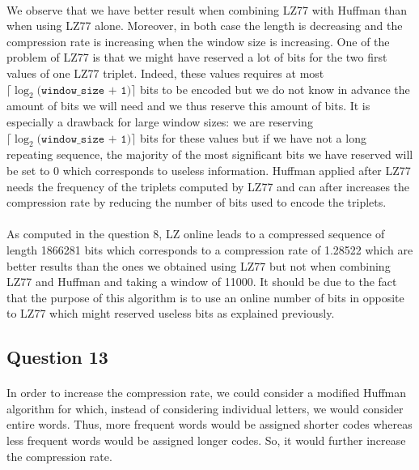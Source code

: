 \documentclass[a4paper, 11pt, oneside]{article}
\begin{document}
\paragraph{}We observe that we have better result when combining LZ77 with Huffman than when using LZ77 alone. Moreover, in both case the length is decreasing and the compression rate is increasing when the window size is increasing.
One of the problem of LZ77 is that we might have reserved a lot of bits for the two first values of one LZ77 triplet. Indeed, these values requires at most $\lceil\log_2({\texttt{window\_size + 1})}\rceil$ bits to be encoded but we do not know in advance the amount of bits we will need and we thus reserve this amount of bits. It is especially a drawback for large window sizes: we are reserving $\lceil\log_2({\texttt{window\_size + 1})}\rceil$  bits for these values but
if we have not a long repeating sequence, the majority of the most significant bits we have reserved will be set to 0 which corresponds to useless information. Huffman applied after LZ77 needs the frequency of the triplets computed by LZ77 
and can after increases the compression rate by reducing the number of bits used to encode the triplets.

\paragraph{}As computed in the question 8, LZ online leads to a compressed sequence of length 1866281 bits which corresponds to a compression rate of 1.28522 which are better results than the ones we obtained using LZ77 but not when combining LZ77 and Huffman and taking a window of 11000.
It should be due to the fact that the purpose of this algorithm is to use an online number of bits in opposite to LZ77 which might reserved useless bits as explained previously.

\subsection{Question 13}
\paragraph{}In order to increase the compression rate, we could consider a modified Huffman algorithm for which, instead of considering individual letters, we would consider
entire words. Thus, more frequent words would be assigned shorter codes whereas less frequent words would be assigned longer codes.
So, it would further increase the compression rate.
\end{document}
